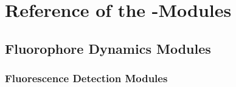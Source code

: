 
\chapter{Reference of the \df-Modules}
\label{sec:ReferenceOfTheDfModules}
\section{Fluorophore Dynamics Modules}
\label{sec:TrajectoryModules}

\subsection{Fluorescence Detection Modules}
\label{sec:DetectionModules}
